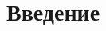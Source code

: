 \documentclass[pscyr,chapters]{hedwork}
\begin{document}
  \maketitle
  \onehalfspacing
  \setcounter{page}{1}
  \tableofcontents


  \chapter*{Введение}

  \pagebreak

  \renewcommand{\bibname}{Список литературы}
  \begin{thebibliography}{9}
  \end{thebibliography}
\end{document}

